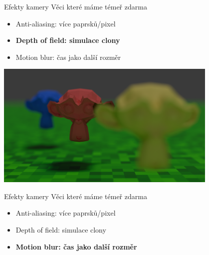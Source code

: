 \documentclass[czech]{beamer}
\begin{document}
\begin{frame}{Efekty kamery}
Věci které máme témeř zdarma
\begin{itemize}
  \item Anti-aliasing: více paprsků/pixel
  \item \textbf{Depth of field: simulace clony}
  \item Motion blur: čas jako další rozměr
\end{itemize}
\vfill
\centering \includegraphics[width=0.8\textwidth]{img/efects DoF.png}
\end{frame}


\begin{frame}{Efekty kamery}
Věci které máme témeř zdarma
\begin{itemize}
  \item Anti-aliasing: více paprsků/pixel
  \item Depth of field: simulace clony
  \item \textbf{Motion blur: čas jako další rozměr}
\end{itemize}
\vfill
{}
\end{frame}
\end{document}
